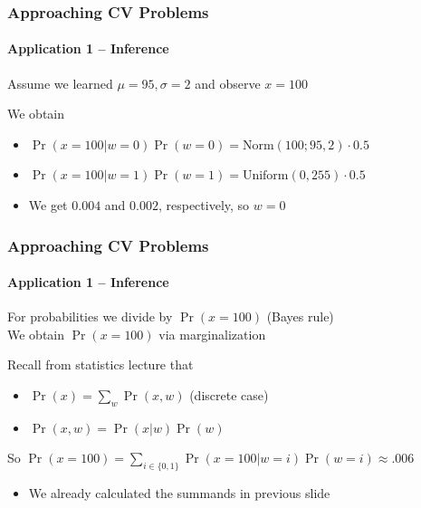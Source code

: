 \documentclass[xetex,professionalfont]{beamer}
\renewcommand\emph[1]{\textcolor{tuwcvl_inf_red}{#1}}
\begin{document}

\begin{frame}
\frametitle{Approaching CV Problems}
\framesubtitle{Application 1 -- Inference}

Assume we learned $\mu=95,\sigma=2$ and observe $x=100$

\bigskip
We obtain
\begin{itemize}
    \item $\Pr(x=100|w=0)\Pr(w=0)=\text{Norm}(100;95,2)\cdot 0.5$
    \item $\Pr(x=100|w=1)\Pr(w=1)=\text{Uniform}(0,255)\cdot 0.5$
    \item We get $0.004$ and $0.002$, respectively, so $w=0$
\end{itemize}

\end{frame}


\begin{frame}
\frametitle{Approaching CV Problems}
\framesubtitle{Application 1 -- Inference}

For probabilities we divide by $\Pr(x=100)$ (Bayes rule) \\\medskip
We obtain $\Pr(x=100)$ via \emph{marginalization}

\bigskip
Recall from statistics lecture that
\begin{itemize}
    \item $\Pr(x)=\sum_w\Pr(x,w)$ (discrete case)
    \item $\Pr(x,w)=\Pr(x|w)\Pr(w)$
\end{itemize}

\bigskip
So $\Pr(x=100)=\sum_{i\in\{0,1\}}\Pr(x=100|w=i)\Pr(w=i)\approx.006$  %
\begin{itemize}
    \item We already calculated the summands in previous slide
\end{itemize}

\end{frame}

\end{document}
